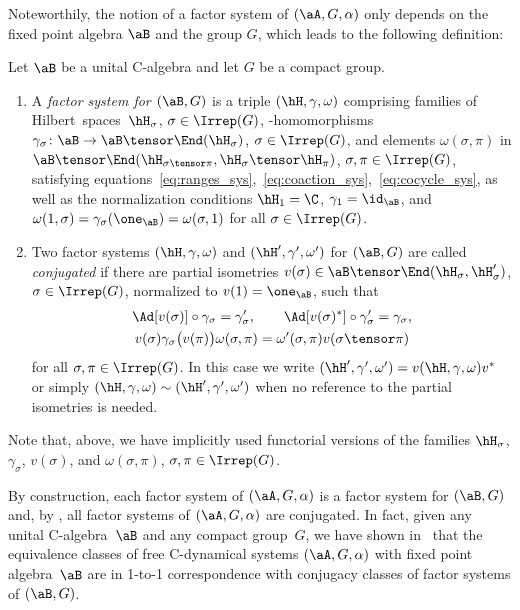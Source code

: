Noteworthily, the notion of a factor system of $(\aA, G, \alpha)$ only depends on the fixed point algebra $\aB$ and the group $G$, which leads to the following definition:

\begin{Definition}\label{def:conjugancy}
	Let $\aB$ be a unital C\Star-algebra and let $G$ be a compact group.
	\begin{enumerate}\itemsep=0pt
	\item 		
		A \emph{factor system for $(\aB,G)$} is a triple $(\hH, \gamma, \omega)$ comprising families of Hilbert~spaces~$\hH_\sigma$, $\sigma \in \Irrep(G)$, \Star-homomorphisms $\gamma_\sigma\colon \aB \to \aB \tensor \End(\hH_\sigma)$, $\sigma \in \Irrep(G)$, and elements $\omega(\sigma, \pi)$ in $\aB \tensor \End(\hH_{\sigma \tensor \pi}, \hH_\sigma \tensor \hH_\pi)$, $\sigma, \pi\in \Irrep(G)$, satisfying equations~\eqref{eq:ranges_sys},~\eqref{eq:coaction_sys},~\eqref{eq:cocycle_sys}, as well as the normalization conditions $\hH_1 = \C$, $\gamma_1 = \id_\aB$, and $\omega(1, \sigma) = \gamma_\sigma(\one_\aB) = \omega(\sigma, 1)$ for all $\sigma \in \Irrep(G)$.
	\item
		Two factor systems $(\hH, \gamma, \omega)$ and $(\hH', \gamma', \omega')$ for $(\aB,G)$ are called \emph{conjugated} if there are partial isometries $v(\sigma) \in \aB \tensor \End(\hH_\sigma,\hH'_\sigma)$, $\sigma \in \Irrep(G)$, normalized to $v(1) = \one_\aB$, such that
		\begin{gather*}
			\Ad[v(\sigma)] \circ \gamma_\sigma = \gamma_\sigma',
			\qquad
			\Ad[v(\sigma)^*] \circ \gamma_\sigma' = \gamma_\sigma,		\\
			v(\sigma) \gamma_\sigma\bigl( v(\pi) \bigr) \omega(\sigma, \pi)
			= \omega'(\sigma, \pi) v(\sigma \tensor \pi)
		\end{gather*}
		for all $\sigma, \pi \in \Irrep(G)$.
		In this case we write $(\hH',\gamma', \omega') = v(\hH, \gamma, \omega)v^*$ or simply $(\hH,\gamma, \omega) \sim (\hH', \gamma', \omega')$ when no reference to the partial isometries is needed.
	\end{enumerate}
Note that, above, we have implicitly used functorial versions of the families $\hH_\sigma$, $\gamma_\sigma$, $v(\sigma)$, and $\omega(\sigma, \pi)$, $\sigma, \pi \in \Irrep(G)$.
\end{Definition}

By construction, each factor system of $(\aA,G,\alpha)$ is a factor system for $(\aB,G)$ and, by \cite[Lemma~4.3]{SchWa17c}, all factor systems of $(\aA, G, \alpha)$ are conjugated. In fact, given any unital C\Star\nobreakdash-algebra~$\aB$ and any compact group~$G$, we have shown in~\cite[Section~5]{SchWa17c} that the equivalence classes of free C\Star-dynamical systems $(\aA, G, \alpha)$ with fixed point algebra~$\aB$ are in 1-to-1 correspondence with conjugacy classes of factor systems of $(\aB,G)$.


